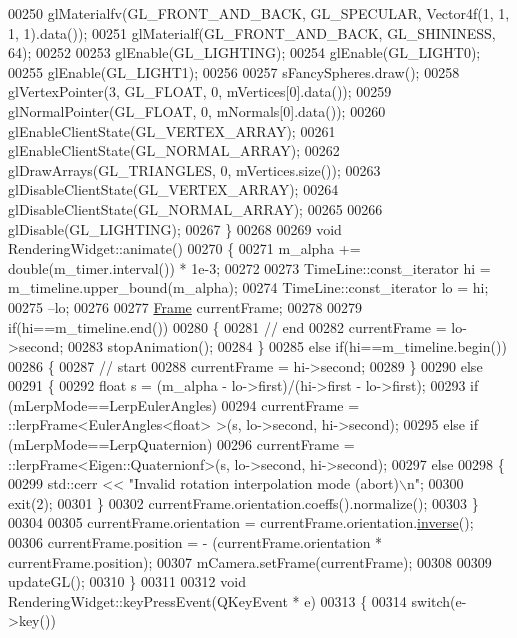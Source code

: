 \begin{DoxyCode}
00250   glMaterialfv(GL\_FRONT\_AND\_BACK, GL\_SPECULAR, Vector4f(1, 1, 1, 1).data());
00251   glMaterialf(GL\_FRONT\_AND\_BACK, GL\_SHININESS, 64);
00252 
00253   glEnable(GL\_LIGHTING);
00254   glEnable(GL\_LIGHT0);
00255   glEnable(GL\_LIGHT1);
00256 
00257   sFancySpheres.draw();
00258   glVertexPointer(3, GL\_FLOAT, 0, mVertices[0].data());
00259   glNormalPointer(GL\_FLOAT, 0, mNormals[0].data());
00260   glEnableClientState(GL\_VERTEX\_ARRAY);
00261   glEnableClientState(GL\_NORMAL\_ARRAY);
00262   glDrawArrays(GL\_TRIANGLES, 0, mVertices.size());
00263   glDisableClientState(GL\_VERTEX\_ARRAY);
00264   glDisableClientState(GL\_NORMAL\_ARRAY);
00265 
00266   glDisable(GL\_LIGHTING);
00267 \}
00268 
00269 \textcolor{keywordtype}{void} RenderingWidget::animate()
00270 \{
00271   m\_alpha += double(m\_timer.interval()) * 1e-3;
00272 
00273   TimeLine::const\_iterator hi = m\_timeline.upper\_bound(m\_alpha);
00274   TimeLine::const\_iterator lo = hi;
00275   --lo;
00276 
00277   \hyperlink{class_frame}{Frame} currentFrame;
00278 
00279   \textcolor{keywordflow}{if}(hi==m\_timeline.end())
00280   \{
00281     \textcolor{comment}{// end}
00282     currentFrame = lo->second;
00283     stopAnimation();
00284   \}
00285   \textcolor{keywordflow}{else} \textcolor{keywordflow}{if}(hi==m\_timeline.begin())
00286   \{
00287     \textcolor{comment}{// start}
00288     currentFrame = hi->second;
00289   \}
00290   \textcolor{keywordflow}{else}
00291   \{
00292     \textcolor{keywordtype}{float} s = (m\_alpha - lo->first)/(hi->first - lo->first);
00293     \textcolor{keywordflow}{if} (mLerpMode==LerpEulerAngles)
00294       currentFrame = ::lerpFrame<EulerAngles<float> >(s, lo->second, hi->second);
00295     \textcolor{keywordflow}{else} \textcolor{keywordflow}{if} (mLerpMode==LerpQuaternion)
00296       currentFrame = ::lerpFrame<Eigen::Quaternionf>(s, lo->second, hi->second);
00297     \textcolor{keywordflow}{else}
00298     \{
00299       std::cerr << \textcolor{stringliteral}{"Invalid rotation interpolation mode (abort)\(\backslash\)n"};
00300       exit(2);
00301     \}
00302     currentFrame.orientation.coeffs().normalize();
00303   \}
00304 
00305   currentFrame.orientation = currentFrame.orientation.\hyperlink{group___geometry___module_a6a1d8af1fe34cb4127f705c0d10ef649}{inverse}();
00306   currentFrame.position = - (currentFrame.orientation * currentFrame.position);
00307   mCamera.setFrame(currentFrame);
00308 
00309   updateGL();
00310 \}
00311 
00312 \textcolor{keywordtype}{void} RenderingWidget::keyPressEvent(QKeyEvent * e)
00313 \{
00314     \textcolor{keywordflow}{switch}(e->key())

\end{DoxyCode}
